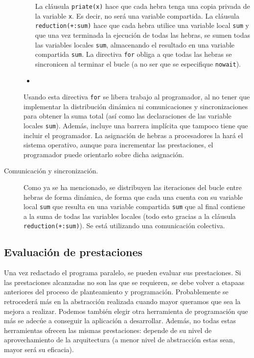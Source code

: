 \begin{description}
\begin{itemize}
                La cláusula \verb|priate(x)| hace que cada hebra tenga una copia privada de la variable \verb|x|. Es decir, no será una variable compartida. La cláusula \verb|reduction(+:sum)| hace que cada hebra utilice una variable local \verb|sum| y que una vez terminada la ejecución de todas las hebras, se sumen todas las variables locales \verb|sum|, almacenando el resultado en una variable compartida \verb|sum|. La directiva \verb|for| obliga a que todas las hebras se sincronicen al terminar el bucle (a no ser que se especifique \verb|nowait|).
            \item 
        \end{itemize}
        Usando esta directiva \verb|for| se libera trabajo al programador, al no tener que implementar la distribución dinámica ni comunicaciones y sincronizaciones para obtener la suma total (así como las declaraciones de las variable locales \verb|sum|). Además, incluye una barrera implícita que tampoco tiene que incluir el programador. La asignación de hebras a procesadores la hará el sistema operativo, aunque para incrementar las prestaciones, el programador puede orientarlo sobre dicha asignación.
    \item [Comunicación y sincronización.] 
        Como ya se ha mencionado, se distribuyen las iteraciones del bucle entre hebras de forma dinámica, de forma que cada una cuenta con su variable local \verb|sum| que resulta en una variable compartida \verb|sum| que al final contiene a la suma de todas las variables locales (todo esto gracias a la cláusula \verb|reduction(+:sum)|). Se está utilizando una comunicación colectiva.
\end{description}

\subsection{Evaluación de prestaciones}
Una vez redactado el programa paralelo, se pueden evaluar sus prestaciones. Si las prestaciones alcanzadas no son las que se requieren, se debe volver a etapaas anteriores del proceso de planteamiento y programación. Probablemente se retrocederá más en la abstracción realizada cuando mayor queramos que sea la mejora a realizar. Podemos también elegir otra herramienta de programación que más se adecúe a conseguir la aplicación a desarrollar. Además, no todas estas herramientas ofrecen las mismas prestaciones: depende de su nivel de aprovechamiento de la arquitectura (a menor nivel de abstracción estas sean, mayor será su eficacia).

